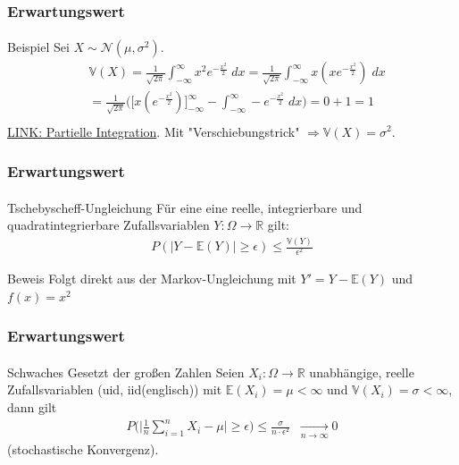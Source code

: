 \documentclass{beamer}
\begin{document}
\begin{frame}
    \frametitle{Erwartungswert}
\framesubtitle{}
\begin{block}{Beispiel}
Sei $X \sim \mathcal{N}(\mu, \sigma^2)$.
\begin{align*}
&\mathbb{V} (X) =  \frac{1}{\sqrt{2 \pi}} \int_{- \infty}^{\infty} x^2 e^{- \frac{x^2}{2}} \; dx =   \frac{1}{\sqrt{2 \pi}} \int_{- \infty}^{\infty} x (xe^{- \frac{x^2}{2}}) \; dx \\
& =  \frac{1}{\sqrt{2 \pi}} \biggl (\biggl [ x (e^{- \frac{x^2}{2}}) \biggr]_{- \infty}^{\infty}   - \int_{- \infty}^{\infty}  - e^{- \frac{x^2}{2}} \; dx  \biggr) = 0 + 1 = 1\\
\end{align*}
\href{https://de.wikipedia.org/wiki/Partielle_Integration}{LINK: Partielle Integration}. Mit "Verschiebungstrick"
$\Rightarrow \mathbb{V}(X) = \sigma^2$.
\end{block}
 \end{frame}


\begin{frame}
    \frametitle{Erwartungswert}
\framesubtitle{}
\begin{block}{Tschebyscheff-Ungleichung}
Für eine  eine  reelle, integrierbare und quadratintegrierbare  Zufallsvariablen $Y : \Omega \to \mathbb{R}$  gilt:
\begin{align*}
P (|Y  - \mathbb{E} (Y)|  \geq \epsilon) \leq \frac{\mathbb{V} (Y)}{ \epsilon^2} 
\end{align*}
\end{block}
\begin{block}{Beweis}
Folgt direkt aus der Markov-Ungleichung mit $Y' = Y -\mathbb{E}(Y)$ und $f(x) = x^2$
\end{block}
 \end{frame}


\begin{frame}
    \frametitle{Erwartungswert}
\framesubtitle{}
\begin{block}{Schwaches Gesetzt der großen Zahlen}
Seien $X_i : \Omega \to \mathbb{R}$ unabhängige, reelle Zufallsvariablen (uid, iid(englisch)) mit $\mathbb{E}(X_i) = \mu < \infty$ und $\mathbb{V}(X_i) = \sigma < \infty$, dann gilt
\begin{align*}
P \bigl  ( \bigl | \frac{1}{n} \sum_{i=1}^{n} X_i - \mu \bigr |  \geq \epsilon \bigr) \leq \frac{\sigma}{ n \cdot \epsilon^2} \; \; \underset{n \to \infty}{\longrightarrow} 0
\end{align*}
(stochastische Konvergenz). 
\end{block}
 \end{frame}
\end{document}
